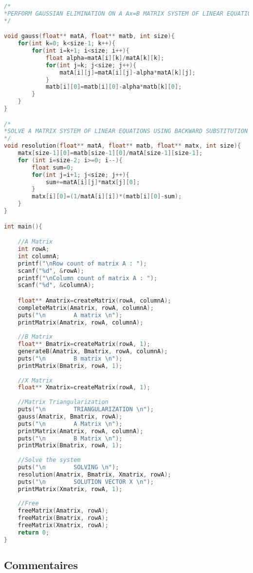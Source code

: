 \begin{lstlisting}[language=C,inputencoding=utf8, basicstyle=\fontsize{8}{10}\selectfont]
/*
*PERFORM GAUSSIAN ELIMINATION ON A Ax=B MATRIX SYSTEM OF LINEAR EQUATIONS
*/

void gauss(float** matA, float** matb, int size){
	for(int k=0; k<size-1; k++){
		for(int i=k+1; i<size; i++){
			float alpha=matA[i][k]/matA[k][k];
			for(int j=k; j<size; j++){
				matA[i][j]=matA[i][j]-alpha*matA[k][j];
			}
			matb[i][0]=matb[i][0]-alpha*matb[k][0];
		}
	}
}

/*
*SOLVE A MATRIX SYSTEM OF LINEAR EQUATIONS USING BACKWARD SUBSTITUTION
*/
void resolution(float** matA, float** matb, float** matx, int size){
	matx[size-1][0]=matb[size-1][0]/matA[size-1][size-1];
	for (int i=size-2; i>=0; i--){
		float sum=0;
		for(int j=i+1; j<size; j++){
			sum+=matA[i][j]*matx[j][0];
		}
		matx[i][0]=(1/matA[i][i])*(matb[i][0]-sum);
	}
}

int main(){

	//A Matrix
	int rowA;
	int columnA;
	printf("\nRow count of matrix A : ");
	scanf("%d", &rowA);
	printf("\nColumn count of matrix A : ");
	scanf("%d", &columnA);

	float** Amatrix=createMatrix(rowA, columnA);
	completeMatrix(Amatrix, rowA, columnA);
	puts("\n		A matrix \n");
	printMatrix(Amatrix, rowA, columnA);
	
	//B Matrix
	float** Bmatrix=createMatrix(rowA, 1);
	generateB(Amatrix, Bmatrix, rowA, columnA);
	puts("\n		B matrix \n");
	printMatrix(Bmatrix, rowA, 1);
	
	//X Matrix
	float** Xmatrix=createMatrix(rowA, 1);
	
	//Matrix Triangularization
	puts("\n		TRIANGULARIZATION \n");
	gauss(Amatrix, Bmatrix, rowA);
	puts("\n		A Matrix \n");
	printMatrix(Amatrix, rowA, columnA);
	puts("\n		B Matrix \n");
	printMatrix(Bmatrix, rowA, 1);
	
	//Solve the system
	puts("\n		SOLVING \n");
	resolution(Amatrix, Bmatrix, Xmatrix, rowA);
	puts("\n		SOLUTION VECTOR X \n");
	printMatrix(Xmatrix, rowA, 1);
	
	//Free
	freeMatrix(Amatrix, rowA);
	freeMatrix(Bmatrix, rowA);
	freeMatrix(Xmatrix, rowA);
	return 0;
}
\end{lstlisting}
\subsection{Commentaires}
